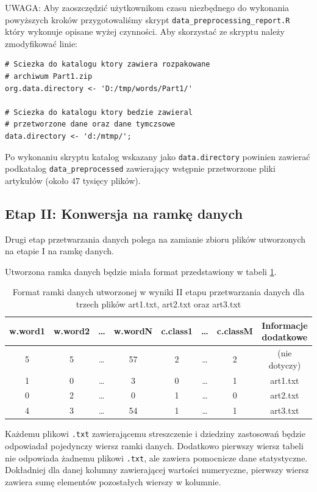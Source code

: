 \documentclass[a4paper,12pt]{article}
\begin{document}
		\textsc{UWAGA:} Aby zaoszczędzić użytkownikom czasu niezbędnego
		do wykonania powyższych kroków przygotowaliśmy skrypt 
		\verb+data_preprocessing_report.R+ który wykonuje opisane wyżej
		czynności. Aby skorzystać ze skryptu należy zmodyfikować
		linie:
		\begin{verbatim}
# Sciezka do katalogu ktory zawiera rozpakowane
# archiwum Part1.zip
org.data.directory <- 'D:/tmp/words/Part1/'

# Sciezka do katalogu ktory bedzie zawieral
# przetworzone dane oraz dane tymczsowe
data.directory <- 'd:/mtmp/';
		\end{verbatim}
		Po wykonaniu skryptu katalog wskazany jako \verb+data.directory+
		powinien zawierać podkatalog \verb+data_preprocessed+ zawierający
		wstępnie przetworzone pliki artykułów (około 47 tysięcy plików).	
	
	\subsection{Etap II: Konwersja na ramkę danych}
		Drugi etap przetwarzania danych polega na zamianie zbioru
		plików utworzonych na etapie I na ramkę danych.
		
		Utworzona ramka danych będzie miała format przedstawiony w
		tabeli \ref{t:df}.
		\begin{table}[!h]	
			\begin{center}	
			\small			
			\begin{tabular}{|c|c|c|c|c|c|c|c|}
				\hline
				w.word1 & w.word2 & \ldots & w.wordN & c.class1 & \ldots & c.classM & Informacje dodatkowe \\
				\hline \hline
				5 & 5 & \ldots & 57 & 2 & \ldots & 2 & (nie dotyczy) \\
				\hline
				1 & 0 & \ldots & 3 & 0 & \ldots & 1 & art1.txt \\
				\hline
				0 & 2 & \ldots & 0 & 1 & \ldots & 0 & art2.txt \\
				\hline
				4 & 3 & \ldots & 54 & 1 & \ldots & 1 & art3.txt \\
				\hline
			\end{tabular}	
			\end{center}				
		
			\caption{Format ramki danych utworzonej w wyniki II etapu
			przetwarzania danych dla trzech plików art1.txt, art2.txt oraz
			art3.txt}
			\label{t:df}
		\end{table}
		Każdemu plikowi \texttt{.txt} zawierającemu streszczenie i 
		dziedziny zastosowań będzie odpowiadał pojedynczy wiersz ramki danych.
		Dodatkowo pierwszy wiersz tabeli nie odpowiada żadnemu plikowi
		\texttt{.txt}, ale zawiera pomocnicze dane statystyczne.
		Dokładniej dla danej kolumny zawierającej wartości numeryczne,
		pierwszy wiersz zawiera sumę elementów pozostałych wierszy w
		kolumnie.
		
\end{document}
